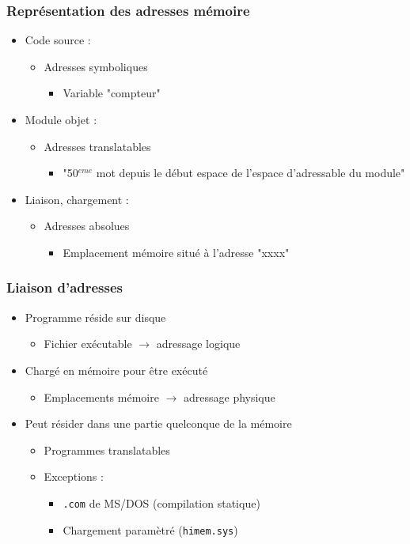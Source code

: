 \begin{frame}
\frametitle{Représentation des adresses mémoire}
\begin{itemize}
\item Code source :
\begin{itemize}
\item Adresses symboliques
\begin{itemize}
\item Variable "compteur"
\end{itemize}
\end{itemize}
\item <2->Module objet :
\begin{itemize}
\item Adresses translatables
\begin{itemize}
\item "50$^{eme}$ mot depuis le début espace de l'espace d'adressable du module"
\end{itemize}
\end{itemize}
\item <3->Liaison, chargement :
\begin{itemize}
\item Adresses absolues
\begin{itemize}
\item Emplacement mémoire situé à l’adresse "xxxx"
\end{itemize}
\end{itemize}
\end{itemize}
\end{frame}


\begin{frame}
\frametitle{Liaison d’adresses}
\begin{itemize}
\item Programme réside sur disque
\begin{itemize}
\item Fichier exécutable $\rightarrow$ adressage logique
\end{itemize}
\item Chargé en mémoire pour être exécuté
\begin{itemize}
\item Emplacements mémoire $\rightarrow$ adressage physique
\end{itemize}
\item Peut résider dans une partie quelconque de la mémoire
\begin{itemize}
\item Programmes translatables
\item Exceptions :
\begin{itemize}
\item \texttt{.com} de MS/DOS (compilation statique)
\item Chargement paramètré (\texttt{himem.sys})
\end{itemize}
\end{itemize}
\end{itemize}
\end{frame}

